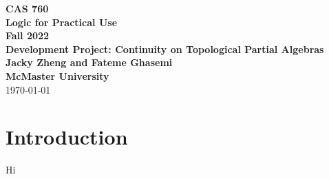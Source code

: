 \documentclass[11pt,fleqn]{article}
\begin{document}
\thispagestyle{empty}

\bc
  {\large \textbf{CAS 760}}\\[2mm]
  {\large \textbf{Logic for Practical Use}}\\[2mm]
  {\large \textbf{Fall 2022}}\\[8mm]
  {\huge \textbf{Development Project: Continuity on Topological Partial Algebras}}\\[6mm]
  {\large \textbf{Jacky Zheng and Fateme Ghasemi }}\\[2mm]
  {\large \textbf{McMaster University}}\\[6mm]
  {\large {\today}}

\ec
\newpage
\tableofcontents
\newpage
\section{Introduction}
Hi
\printbibliography[heading=bibintoc]
\end{document}
